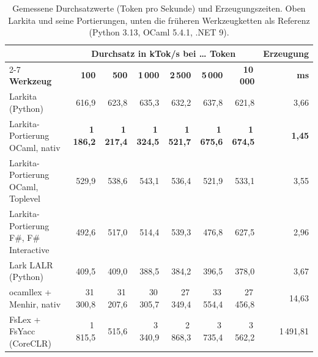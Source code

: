 \begin{table}[htbp]
  \centering
  \footnotesize
  \setlength{\tabcolsep}{3pt}
  \caption{Gemessene Durchsatzwerte (Token pro Sekunde) und Erzeugungszeiten.
  Oben Larkita und seine Portierungen, unten die früheren Werkzeugketten als Referenz (Python 3.13, OCaml 5.4.1, .NET 9).}
  \label{tab:parser_throughput}
  \begin{tabularx}{\textwidth}{Xrrrrrrr}
    \toprule
    & \multicolumn{6}{c}{\textbf{Durchsatz in kTok/s bei \dots{} Token}} & \textbf{Erzeugung} \\
    \cmidrule(lr){2-7}
    \textbf{Werkzeug} & \textbf{100} & \textbf{500} & \textbf{1\,000} & \textbf{2\,500} & \textbf{5\,000} & \textbf{10\,000} & \textbf{ms} \\
    \midrule
    Larkita (Python)                  & 616,9 & 623,8 & 635,3 & 632,2 & 637,8 & 621,8 & 3,66 \\
    Larkita-Portierung OCaml, nativ   & \textbf{1\,186,2} & \textbf{1\,217,4} & \textbf{1\,324,5} & \textbf{1\,521,7} & \textbf{1\,675,6} & \textbf{1\,674,5} & \textbf{1,45} \\
    Larkita-Portierung OCaml, Toplevel & 529,9 & 538,6 & 543,1 & 536,4 & 521,9 & 533,1 & 3,55 \\
    Larkita-Portierung F\#, F\# Interactive & 492,6 & 517,0 & 514,4 & 539,3 & 476,8 & 627,5 & 2,96 \\
    \midrule
    Lark LALR (Python)                & 409,5 & 409,0 & 388,5 & 384,2 & 396,5 & 378,0 & 3,67 \\
    ocamllex + Menhir, nativ          & 31\,300,8 & 31\,207,6 & 30\,305,7 & 27\,349,4 & 33\,554,4 & 27\,456,8 & 14,63 \\
    FsLex + FsYacc (CoreCLR)          & 1\,815,5 & 515,6 & 3\,340,9 & 2\,868,3 & 3\,735,4 & 3\,562,2 & 1\,491,81 \\
    \bottomrule
  \end{tabularx}
\end{table}


